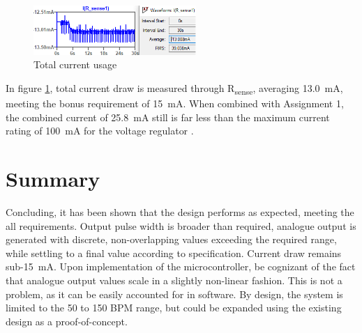 \begin{figure}
\centering
\vspace{-0.3cm}
\includegraphics[width=0.55\textwidth]{./Figures/current2}
\caption{Total current usage}
\label{fig:current2}
\end{figure}
In figure \ref{fig:current2}, total current draw is measured through R\textsubscript{sense}, averaging \SI{13.0}{mA}, meeting the bonus requirement of \SI{15}{mA}. When combined with Assignment 1, the combined current of \SI{25.8}{mA} still is far less than the maximum current rating of \SI{100}{mA} for the voltage regulator \cite{prev}. 

\section{Summary}\label{sec:temp_summary}
Concluding, it has been shown that the design performs as expected, meeting the all requirements. Output pulse width is broader than required, analogue output is generated with discrete, non-overlapping values exceeding the required range, while settling to a final value according to specification.  Current draw remains sub-\SI{15}{mA}. Upon implementation of the microcontroller, be cognizant of the fact that analogue output values scale in a slightly non-linear fashion. This is not a problem, as it can be easily accounted for in software. By design, the system is limited to the 50 to 150 BPM range, but could be expanded using the existing design as a proof-of-concept. 

